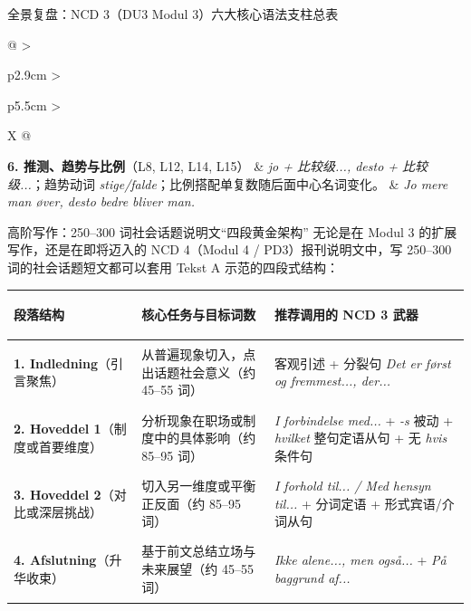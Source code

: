 \begin{grammatikbox}{全景复盘：NCD 3（DU3 Modul 3）六大核心语法支柱总表}
{\begin{tabularx}{\linewidth}{@{} >{\bfseries\raggedright\arraybackslash}p{2.9cm} >{\raggedright\arraybackslash}p{5.5cm} >{\raggedright\arraybackslash}X @{}}
\midrule
\textbf{6. 推测、趋势与比例}\newline （L8, L12, L14, L15） & \textit{jo + 比较级..., desto + 比较级...}；趋势动词 \textit{stige/falde}；比例搭配单复数随后面中心名词变化。 & \textit{Jo mere man øver, desto bedre bliver man.} \\
\bottomrule
\end{tabularx}
}
\end{grammatikbox}

\begin{grammatikbox}{高阶写作：250--300 词社会话题说明文“四段黄金架构”}
无论是在 Modul 3 的扩展写作，还是在即将迈入的 NCD 4（Modul 4 / PD3）报刊说明文中，写 250--300 词的社会话题短文都可以套用 Tekst A 示范的四段式结构：

\vspace{0.3em}
\renewcommand{\arraystretch}{1.24}
{\small
\begin{tabularx}{\linewidth}{@{} >{\bfseries\raggedright\arraybackslash}p{2.9cm} >{\raggedright\arraybackslash}p{5.5cm} >{\raggedright\arraybackslash}X @{}}
\toprule
\textbf{段落结构} & \textbf{核心任务与目标词数} & \textbf{推荐调用的 NCD 3 武器} \\
\midrule
\textbf{1. Indledning}\newline （引言聚焦） & 从普遍现象切入，点出话题社会意义（约 45--55 词） & 客观引述 + 分裂句 \textit{Det er først og fremmest..., der...} \\
\midrule
\textbf{2. Hoveddel 1}\newline （制度或首要维度） & 分析现象在职场或制度中的具体影响（约 85--95 词） & \textit{I forbindelse med...} + \textit{-s} 被动 + \textit{hvilket} 整句定语从句 + 无 \textit{hvis} 条件句 \\
\midrule
\textbf{3. Hoveddel 2}\newline （对比或深层挑战） & 切入另一维度或平衡正反面（约 85--95 词） & \textit{I forhold til... / Med hensyn til...} + 分词定语 + 形式宾语/介词从句 \\
\midrule
\textbf{4. Afslutning}\newline （升华收束） & 基于前文总结立场与未来展望（约 45--55 词） & \textit{Ikke alene..., men også...} + \textit{På baggrund af...} \\
\bottomrule
\end{tabularx}
}
\end{grammatikbox}

